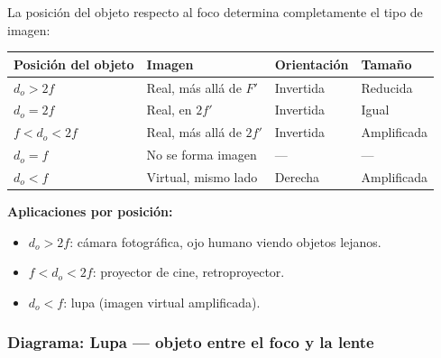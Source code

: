 \begin{seccion}
La posición del objeto respecto al foco determina completamente el tipo de imagen:

\begin{center}
\begin{tabular}{llll}
\hline
\rowcolor{fondogris}
\textbf{Posición del objeto} & \textbf{Imagen} & \textbf{Orientación} & \textbf{Tamaño} \\
\hline
$d_o > 2f$         & Real, más allá de $F'$   & Invertida & Reducida \\
$d_o = 2f$         & Real, en $2f'$            & Invertida & Igual \\
$f < d_o < 2f$     & Real, más allá de $2f'$  & Invertida & Amplificada \\
$d_o = f$          & No se forma imagen        & ---       & ---    \\
$d_o < f$          & Virtual, mismo lado       & Derecha   & Amplificada \\
\hline
\end{tabular}
\end{center}

\textbf{Aplicaciones por posición:}
\begin{itemize}
    \item $d_o > 2f$: cámara fotográfica, ojo humano viendo objetos lejanos.
    \item $f < d_o < 2f$: proyector de cine, retroproyector.
    \item $d_o < f$: lupa (imagen virtual amplificada).
\end{itemize}
\end{seccion}

\subsubsection{Diagrama: Lupa — objeto entre el foco y la lente}

